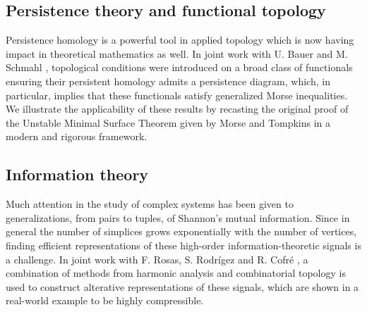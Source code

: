\subsection{Persistence theory and functional topology}

Persistence homology is a powerful tool in applied topology which is now having impact in theoretical mathematics as well.
In joint work with U. Bauer and M. Schmahl \cite{medina2022fuct_top}, topological conditions were introduced on a broad class of functionals ensuring their persistent homology admits a persistence diagram, which, in particular, implies that these functionals satisfy generalized Morse inequalities.
We illustrate the applicability of these results by recasting the original proof of the Unstable Minimal Surface Theorem given by Morse and Tompkins in a modern and rigorous framework.

\subsection{Information theory}

Much attention in the study of complex systems has been given to generalizations, from pairs to tuples, of Shannon's mutual information.
Since in general the number of simplices grows exponentially with the number of vertices, finding efficient representations of these high-order information-theoretic signals is a challenge.
In joint work with F. Rosas, S. Rodr\'igez and R. Cofr\'e  \cite{medina2021hyperharmonic}, a combination of methods from harmonic analysis and combinatorial topology is used to construct alterative representations of these signals, which are shown in a real-world example to be highly compressible.